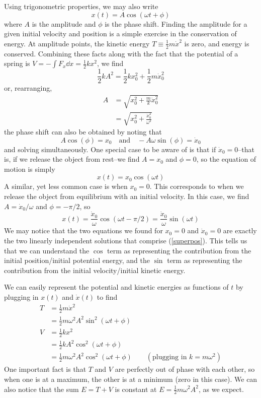 Using trigonometric properties, we may also write
\[ x(t) = A\cos(\omega t + \phi) \]
where $A$ is the amplitude and $\phi$ is the phase shift. Finding the amplitude for a given initial velocity and position is a simple exercise in the conservation of energy. At amplitude points, the kinetic energy $T\equiv \frac{1}{2}m\dot x^2$ is zero, and energy is conserved. Combining these facts along with the fact that the potential of a spring is $V = -\int F_x \dd  x = \frac{1}{2}kx^2$, we find
\[ \frac{1}{2}kA^2 = \frac{1}{2}kx_0^2 + \frac{1}{2}m\dot x_0^2 \]
or, rearranging,
\begin{align}
    A &= \sqrt{x_0^2 + \frac{m}{k}\dot x_0^2} \nonumber \\
    &= \sqrt{x_0^2 + \frac{\dot x_0^2}{\omega^2}}
\end{align}
the phase shift can also be obtained by noting that
\[ A\cos(\phi) = x_0 \quad\text{and}\quad -A\omega\sin(\phi) = \dot x_0\]
and solving simultaneously. One special case to be aware of is that if $\dot x_0 =0$--that is, if we release the object from rest--we find $A = x_0$ and $\phi = 0$, so the equation of motion is simply
\[ x(t) = x_0\cos(\omega t) \]
A similar, yet less common case is when $x_0 = 0$. This corresponds to when we release the object from equilibrium with an initial velocity. In this case, we find $A = \dot x_0/\omega$ and $\phi = -\pi/2$, so
\[ x(t) = \frac{\dot x_0}{\omega}\cos(\omega t - \pi/2) = \frac{\dot x_0}{\omega}\sin(\omega t)\]
We may notice that the two equations we found for $x_0 = 0$ and $\dot x_0 = 0$ are exactly the two linearly independent solutions that comprise (\ref{superpos}). This tells us that we can understand the $\cos$ term as representing the contribution from the initial position/initial potential energy, and the $\sin$ term as representing the contribution from the initial velocity/initial kinetic energy.

We can easily represent the potential and kinetic energies as functions of $t$ by plugging in $x(t)$ and $\dot x(t)$ to find
\begin{align}
    T &= \frac{1}{2}m\dot x^2 \nonumber \\ 
    &= \frac{1}{2}m\omega^2 A^2\sin^2(\omega t + \phi)   \\
    V &= \frac{1}{2}kx^2 \nonumber \\
    &= \frac{1}{2}kA^2\cos^2(\omega t+\phi) \nonumber \\
    &= \frac{1}{2}m\omega^2A^2\cos^2(\omega t + \phi) \quad\quad(\text{plugging in } k = m\omega^2 )
\end{align}
One important fact is that $T$ and $V$ are perfectly out of phase with each other, so when one is at a maximum, the other is at a minimum (zero in this case). We can also notice that the sum $E = T +V$ is constant at $E = \frac{1}{2}m\omega^2A^2$, as we expect.
